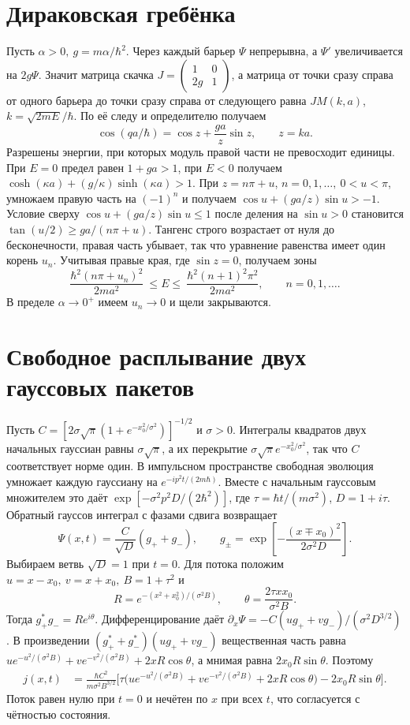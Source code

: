 \documentclass[11pt,a4paper]{article}
\begin{document}
\section{Дираковская гребёнка}

Пусть \(\alpha>0,\ g=m\alpha/\hbar^2\). Через каждый
барьер \(\Psi\) непрерывна, а \(\Psi'\) увеличивается на \(2g\Psi\).
Значит матрица скачка \(J=\begin{pmatrix}1&0\\2g&1\end{pmatrix}\),
а матрица от точки сразу справа от одного барьера до точки сразу
справа от следующего равна \(JM(k,a)\), \(k=\sqrt{2mE}/\hbar\).
По её следу и определителю получаем
\[
 \cos(qa/\hbar)=\cos z+\frac{ga}{z}\sin z,\qquad z=ka.
\]
Разрешены энергии, при которых модуль правой части не превосходит
единицы. При \(E=0\) предел равен \(1+ga>1\),
при \(E<0\) получаем \(\cosh(\kappa a)+(g/\kappa)\sinh(\kappa a)>1\).
При \(z=n\pi+u\), \(n=0,1,\ldots,\ 0<u<\pi\),
умножаем правую часть на \((-1)^n\) и получаем
\(\cos u+(ga/z)\sin u>-1\).
Условие сверху \(\cos u+(ga/z)\sin u\le1\) после деления на
\(\sin u>0\) становится \(\tan(u/2)\ge ga/(n\pi+u)\).
Тангенс строго возрастает от нуля до бесконечности, правая
часть убывает, так что уравнение равенства имеет один корень \(u_n\).
Учитывая правые края, где \(\sin z=0\), получаем зоны
\[
 \frac{\hbar^2(n\pi+u_n)^2}{2ma^2}\ \le E\le\
 \frac{\hbar^2(n+1)^2\pi^2}{2ma^2},\qquad n=0,1,\ldots .
\]
В пределе \(\alpha\to0^+\) имеем \(u_n\to0\) и щели закрываются.

\section{Свободное расплывание двух гауссовых пакетов}

Пусть \(C=[2\sigma\sqrt\pi(1+e^{-x_0^2/\sigma^2})]^{-1/2}\)
и \(\sigma>0\). Интегралы квадратов двух начальных гауссиан
равны \(\sigma\sqrt\pi\), а их перекрытие
\(\sigma\sqrt\pi e^{-x_0^2/\sigma^2}\), так что \(C\)
соответствует норме один. В импульсном пространстве свободная
эволюция умножает каждую гауссиану на \(e^{-ip^2t/(2m\hbar)}\).
Вместе с начальным гауссовым множителем это даёт
\(\exp[-\sigma^2p^2 D/(2\hbar^2)]\), где
\(\tau=\hbar t/(m\sigma^2)\), \(D=1+i\tau\).
Обратный гауссов интеграл с фазами сдвига возвращает
\[
 \Psi(x,t)=\frac C{\sqrt D}(g_++g_-),\qquad
 g_\pm=\exp\!\left[-\frac{(x\mp x_0)^2}{2\sigma^2 D}\right].
\]
Выбираем ветвь \(\sqrt D=1\) при \(t=0\).
Для потока положим \(u=x-x_0,\ v=x+x_0,\ B=1+\tau^2\) и
\[
 R=e^{-(x^2+x_0^2)/(\sigma^2 B)},\qquad
 \theta=\frac{2\tau x x_0}{\sigma^2 B}.
\]
Тогда \(g_+^*g_-=Re^{i\theta}\).
Дифференцирование даёт \(\partial_x\Psi
=-C(u g_++v g_-)/(\sigma^2 D^{3/2})\).
В произведении \((g_+^*+g_-^*)(u g_++v g_-)\)
вещественная часть равна
\(u e^{-u^2/(\sigma^2 B)}+v e^{-v^2/(\sigma^2 B)}+2xR\cos\theta\),
а мнимая равна \(2x_0 R\sin\theta\). Поэтому
\begin{align*}
 j(x,t)&=\frac{\hbar C^2}{m\sigma^2 B^{3/2}}\Big[
 \tau\big(u e^{-u^2/(\sigma^2B)}+v e^{-v^2/(\sigma^2B)}
                   +2xR\cos\theta\big)-2x_0R\sin\theta\Big].
\end{align*}
Поток равен нулю при \(t=0\) и нечётен по \(x\) при всех \(t\),
что согласуется с чётностью состояния.
\end{document}

